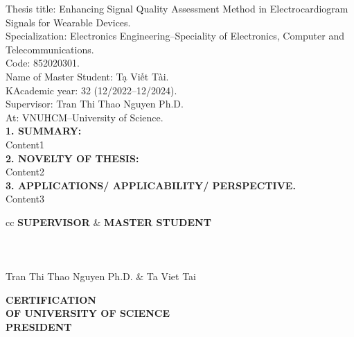 \begin{flushleft}
	Thesis title: Enhancing Signal Quality Assessment Method in Electrocardiogram Signals for Wearable Devices. \\
	Specialization: Electronics Engineering--Speciality of Electronics, Computer and Telecommunications. \\
	Code: 852020301. \\
	Name of Master Student: Tạ Viết Tài. \\
	KAcademic year: 32 (12/2022--12/2024). \\
	Supervisor: Tran Thi Thao Nguyen Ph.D.\\
	At: VNUHCM--University of Science.\\
	\vspace{1.5em}
	\textbf{1. SUMMARY:}\\
	Content1 \\
	\textbf{2. NOVELTY OF THESIS:}\\
	Content2 \\
	\textbf{3. APPLICATIONS/ APPLICABILITY/ PERSPECTIVE.}\\
	Content3 \\
\end{flushleft}


\vspace{1.5em}
\begin{tblr}{cc}
    \centering
    \textbf{SUPERVISOR} & \textbf{\hspace{6.0em}MASTER STUDENT} \\
    \\
    \\
    \\
    Tran Thi Thao Nguyen Ph.D. & \hspace{6.0em} Ta Viet Tai
\end{tblr}

\vspace{2.5em}
\begin{center}
    \textbf{CERTIFICATION}\\
	\textbf{OF UNIVERSITY OF SCIENCE} \\
    \textbf{PRESIDENT}
\end{center}